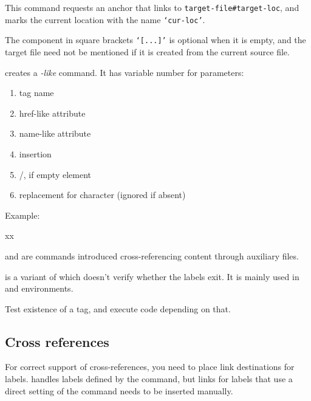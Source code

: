 This command requests an anchor that links to \verb|target-file#target-loc|, and marks the current location with the name \verb|‘cur-loc’|.

The component in square brackets \texttt{‘[...]’} is optional when it is empty, 
and the target file need not be mentioned if it is created from the current source file.


 creates a \textit{-like} command. It has variable number for parameters:

\begin{enumerate}
  \item tag name
  \item href-like attribute
  \item name-like attribute
  \item insertion
  \item /, if empty element
  \item replacement for \texcommand{#} character  (ignored if absent)
\end{enumerate}

Example:

\begin{texsource}
\LinkCommand{}
\def\jsref="#1"{href="javascript:window.open('#1')"}

xx\EndJSLink %
\EndLink       %
\end{texsource}


 and  are  commands introduced cross-referencing
content through  auxiliary files.

 is a variant of  which doesn't verify whether the
labels exit.  It is mainly used in  and  environments.


Test existence of a tag, and execute code depending on that.


\subsection{Cross references}

For correct support of cross-references, you need to place link destinations for labels.
\texfourht{} handles labels defined by the  command, 
but links for labels that use a direct setting of the  command needs to be 
inserted manually.

